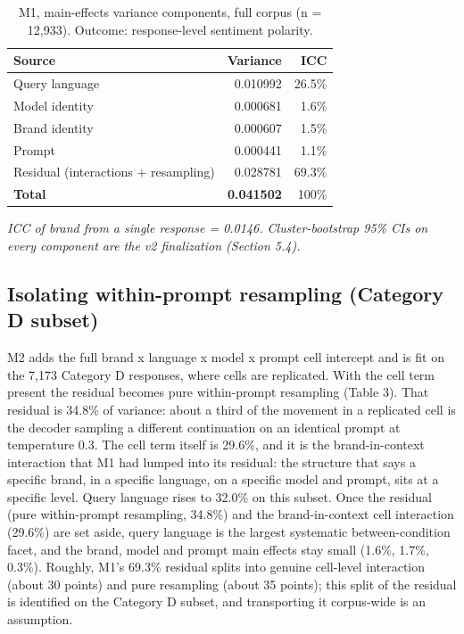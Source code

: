 \documentclass[pdflatex,sn-mathphys-num]{sn-jnl}
\begin{document}
\begin{table}[htbp]
\caption{M1, main-effects variance components, full corpus (n = 12,933). Outcome: response-level sentiment polarity.}
\small
\begin{tabularx}{\textwidth}{@{}>{\raggedright\arraybackslash}Xrr@{}}
\toprule
Source & Variance & ICC \\
\midrule

Query language & 0.010992 & 26.5\% \\
Model identity & 0.000681 & 1.6\% \\
Brand identity & 0.000607 & 1.5\% \\
Prompt & 0.000441 & 1.1\% \\
Residual (interactions + resampling) & 0.028781 & 69.3\% \\
\textbf{Total} & \textbf{0.041502} & 100\% \\
\bottomrule
\end{tabularx}
\end{table}

\emph{ICC of brand from a single response = 0.0146. Cluster-bootstrap 95\% CIs on every component are the v2 finalization (Section 5.4).}

\subsection{Isolating within-prompt resampling (Category D subset)}\label{isolating-within-prompt-resampling-category-d-subset}

M2 adds the full brand x language x model x prompt cell intercept and is fit on the 7,173 Category D responses, where cells are replicated. With the cell term present the residual becomes pure within-prompt resampling (Table 3). That residual is 34.8\% of variance: about a third of the movement in a replicated cell is the decoder sampling a different continuation on an identical prompt at temperature 0.3. The cell term itself is 29.6\%, and it is the brand-in-context interaction that M1 had lumped into its residual: the structure that says a specific brand, in a specific language, on a specific model and prompt, sits at a specific level. Query language rises to 32.0\% on this subset. Once the residual (pure within-prompt resampling, 34.8\%) and the brand-in-context cell interaction (29.6\%) are set aside, query language is the largest systematic between-condition facet, and the brand, model and prompt main effects stay small (1.6\%, 1.7\%, 0.3\%). Roughly, M1's 69.3\% residual splits into genuine cell-level interaction (about 30 points) and pure resampling (about 35 points); this split of the residual is identified on the Category D subset, and transporting it corpus-wide is an assumption.
\end{document}
